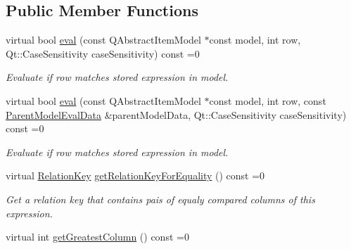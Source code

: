 \subsection*{Public Member Functions}
\begin{DoxyCompactItemize}
\item 
virtual bool \hyperlink{class_mdt_1_1_item_model_1_1_expression_1_1_container_interface_a2d24ef03a002562a9e395a6e4e5cce36}{eval} (const Q\+Abstract\+Item\+Model $\ast$const model, int row, Qt\+::\+Case\+Sensitivity case\+Sensitivity) const =0
\begin{DoxyCompactList}\small\item\em Evaluate if row matches stored expression in model. \end{DoxyCompactList}\item 
virtual bool \hyperlink{class_mdt_1_1_item_model_1_1_expression_1_1_container_interface_aa07af77ddc086a9d7bdc851ecc5e8b25}{eval} (const Q\+Abstract\+Item\+Model $\ast$const model, int row, const \hyperlink{class_mdt_1_1_item_model_1_1_expression_1_1_parent_model_eval_data}{Parent\+Model\+Eval\+Data} \&parent\+Model\+Data, Qt\+::\+Case\+Sensitivity case\+Sensitivity) const =0
\begin{DoxyCompactList}\small\item\em Evaluate if row matches stored expression in model. \end{DoxyCompactList}\item 
virtual \hyperlink{class_mdt_1_1_item_model_1_1_relation_key}{Relation\+Key} \hyperlink{class_mdt_1_1_item_model_1_1_expression_1_1_container_interface_af55900089c16d4d580eeb1489912068b}{get\+Relation\+Key\+For\+Equality} () const =0\hypertarget{class_mdt_1_1_item_model_1_1_expression_1_1_container_interface_af55900089c16d4d580eeb1489912068b}{}\label{class_mdt_1_1_item_model_1_1_expression_1_1_container_interface_af55900089c16d4d580eeb1489912068b}

\begin{DoxyCompactList}\small\item\em Get a relation key that contains pais of equaly compared columns of this expression. \end{DoxyCompactList}\item 
virtual int \hyperlink{class_mdt_1_1_item_model_1_1_expression_1_1_container_interface_ab53dfe2e8d51e95952f7068e1a06c20a}{get\+Greatest\+Column} () const =0\hypertarget{class_mdt_1_1_item_model_1_1_expression_1_1_container_interface_ab53dfe2e8d51e95952f7068e1a06c20a}{}\label{class_mdt_1_1_item_model_1_1_expression_1_1_container_interface_ab53dfe2e8d51e95952f7068e1a06c20a}


\end{DoxyCompactItemize}
